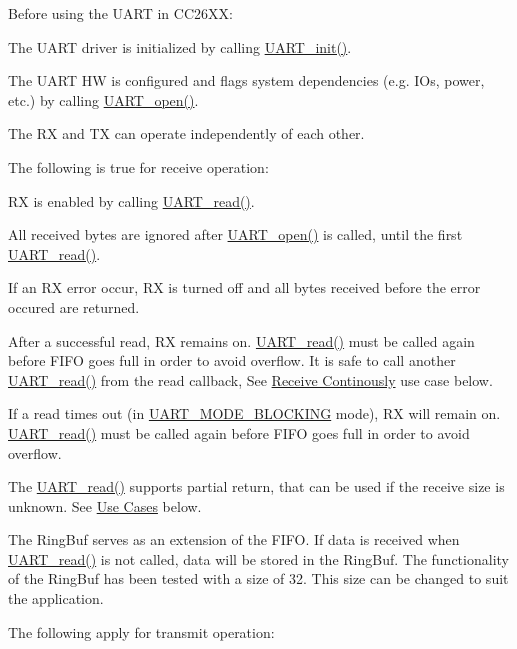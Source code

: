 Before using the U\+A\+R\+T in C\+C26\+X\+X\+:
\begin{DoxyItemize}
\item The U\+A\+R\+T driver is initialized by calling \hyperlink{_u_a_r_t_8h_ab60a36f7295d704926120d22f806dcd1}{U\+A\+R\+T\+\_\+init()}.
\item The U\+A\+R\+T H\+W is configured and flags system dependencies (e.\+g. I\+Os, power, etc.) by calling \hyperlink{_u_a_r_t_8h_a0442ea1ec23901168da31726bb3254c1}{U\+A\+R\+T\+\_\+open()}.
\item The R\+X and T\+X can operate independently of each other.
\end{DoxyItemize}The following is true for receive operation\+:
\begin{DoxyItemize}
\item R\+X is enabled by calling \hyperlink{_u_a_r_t_8h_a023152d57539cad94bdd813956013e73}{U\+A\+R\+T\+\_\+read()}.
\item All received bytes are ignored after \hyperlink{_u_a_r_t_8h_a0442ea1ec23901168da31726bb3254c1}{U\+A\+R\+T\+\_\+open()} is called, until the first \hyperlink{_u_a_r_t_8h_a023152d57539cad94bdd813956013e73}{U\+A\+R\+T\+\_\+read()}.
\item If an R\+X error occur, R\+X is turned off and all bytes received before the error occured are returned.
\item After a successful read, R\+X remains on. \hyperlink{_u_a_r_t_8h_a023152d57539cad94bdd813956013e73}{U\+A\+R\+T\+\_\+read()} must be called again before F\+I\+F\+O goes full in order to avoid overflow. It is safe to call another \hyperlink{_u_a_r_t_8h_a023152d57539cad94bdd813956013e73}{U\+A\+R\+T\+\_\+read()} from the read callback, See \hyperlink{_u_a_r_t_c_c26_x_x_8h_USE_CASE_CB}{Receive Continously} use case below.
\item If a read times out (in \hyperlink{_u_a_r_t_8h_a2507a620dba95cd20885c52494d19e90ae6b6bd5d2d5df859ad6724e89e605ebf}{U\+A\+R\+T\+\_\+\+M\+O\+D\+E\+\_\+\+B\+L\+O\+C\+K\+I\+N\+G} mode), R\+X will remain on. \hyperlink{_u_a_r_t_8h_a023152d57539cad94bdd813956013e73}{U\+A\+R\+T\+\_\+read()} must be called again before F\+I\+F\+O goes full in order to avoid overflow.
\item The \hyperlink{_u_a_r_t_8h_a023152d57539cad94bdd813956013e73}{U\+A\+R\+T\+\_\+read()} supports partial return, that can be used if the receive size is unknown. See \hyperlink{_u_a_r_t_c_c26_x_x_8h_USE_CASES}{Use Cases} below.
\item The Ring\+Buf serves as an extension of the F\+I\+F\+O. If data is received when \hyperlink{_u_a_r_t_8h_a023152d57539cad94bdd813956013e73}{U\+A\+R\+T\+\_\+read()} is not called, data will be stored in the Ring\+Buf. The functionality of the Ring\+Buf has been tested with a size of 32. This size can be changed to suit the application.
\end{DoxyItemize}The following apply for transmit operation\+:
